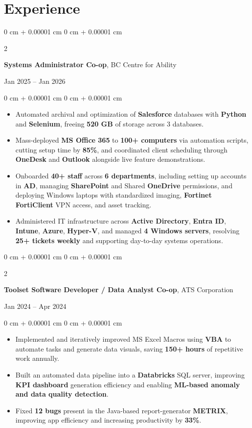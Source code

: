 \documentclass[9pt, letterpaper]{extarticle}
\newenvironment{highlights}{
    \begin{itemize}[
        topsep=0.10 cm,
        parsep=0.10 cm,
        partopsep=0pt,
        itemsep=0pt,
        leftmargin=0 cm + 10pt
    ]
}{
    \end{itemize}
} %
\newenvironment{onecolentry}{
    \begin{adjustwidth}{
        0 cm + 0.00001 cm
    }{
        0 cm + 0.00001 cm
    }
}{
    \end{adjustwidth}
} %
\newenvironment{twocolentry}[2][]{
    \onecolentry
    \def\secondColumn{#2}
    \setcolumnwidth{\fill, 4.5 cm}
    \begin{paracol}{2}
}{
    \switchcolumn \raggedleft \secondColumn
    \end{paracol}
    \endonecolentry
} %
\begin{document}
    \section{Experience}
    \begin{twocolentry}{Jan 2025 – Jan 2026}
        \textbf{Systems Administrator Co-op}, BC Centre for Ability
    \end{twocolentry}
    \vspace{0.10 cm}
    \begin{onecolentry}
        \begin{highlights}
            \item Automated archival and optimization of \textbf{Salesforce} databases with \textbf{Python} and \textbf{Selenium}, freeing \textbf{520 GB} of storage across 3 databases.
            \item Mass-deployed \textbf{MS Office 365} to \textbf{100+ computers} via automation scripts, cutting setup time by \textbf{85\%}, and coordinated client scheduling through \textbf{OneDesk} and \textbf{Outlook} alongside live feature demonstrations.
            \item Onboarded \textbf{40+ staff} across \textbf{6 departments}, including setting up accounts in \textbf{AD}, managing \textbf{SharePoint} and Shared \textbf{OneDrive} permissions, and deploying Windows laptops with standardized imaging, \textbf{Fortinet FortiClient} VPN access, and asset tracking.
            \item Administered IT infrastructure across \textbf{Active Directory}, \textbf{Entra ID}, \textbf{Intune}, \textbf{Azure}, \textbf{Hyper-V}, and managed \textbf{4 Windows servers}, resolving \textbf{25+ tickets weekly} and supporting day-to-day systems operations.
        \end{highlights}
    \end{onecolentry}
    \vspace{0.2 cm}
    \begin{twocolentry}{Jan 2024 – Apr 2024}
        \textbf{Toolset Software Developer / Data Analyst Co-op}, ATS Corporation
    \end{twocolentry}
    \vspace{0.10 cm}
    \begin{onecolentry}
        \begin{highlights}
            \item Implemented and iteratively improved MS Excel Macros using \textbf{VBA} to automate tasks and generate data visuals, saving \textbf{150+ hours} of repetitive work annually.
            \item Built an automated data pipeline into a \textbf{Databricks} SQL server, improving \textbf{KPI dashboard} generation efficiency and enabling \textbf{ML-based anomaly and data quality detection}.
            \item Fixed \textbf{12 bugs} present in the Java-based report-generator \textbf{METRIX}, improving app efficiency and increasing productivity by \textbf{33\%}.
        \end{highlights}
    \end{onecolentry}
\end{document}

